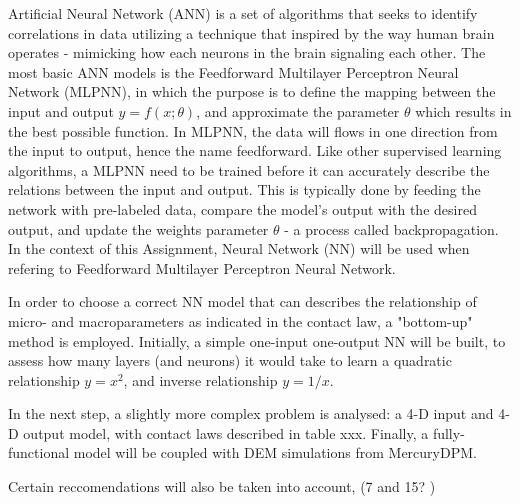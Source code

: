 \documentclass[../BachelorAssignment.tex]{subfiles}
\begin{document}
\graphicspath{{\subfix{../Images/}}}

Artificial Neural Network (ANN) is a set of algorithms that seeks to identify correlations in data utilizing a technique that inspired by the way human brain operates - mimicking how each neurons in the brain signaling each other. The most basic ANN models is the Feedforward Multilayer Perceptron Neural Network (MLPNN), in which the purpose is to define the mapping between the input and output \(y = f(x;\theta)\), and approximate the parameter \(\theta\) which results in the best possible function. In MLPNN, the data will flows in one direction from the input to output, hence the name feedforward. Like other supervised learning algorithms, a MLPNN need to be trained before it can accurately describe the relations between the input and output. This is typically done by feeding the network with pre-labeled data, compare the model's output with the desired output, and update the weights parameter \(\theta\) - a process called backpropagation. In the context of this Assignment, Neural Network (NN) will be used when refering to Feedforward Multilayer Perceptron Neural Network. 



In order to choose a correct NN model that can describes the relationship of micro- and macroparameters as indicated in the contact law, a "bottom-up" method is employed. Initially, a simple one-input one-output NN will be built, to assess how many layers (and neurons) it would take to learn a quadratic relationship \(y = x^2\), and inverse relationship \(y = 1/x\).

In the next step, a slightly more complex problem is analysed: a 4-D input and 4-D output model, with contact laws described in table xxx. Finally, a fully-functional model will be coupled with DEM simulations from MercuryDPM.   

Certain reccomendations will also be taken into account, (7 and 15? )
\end{document}
